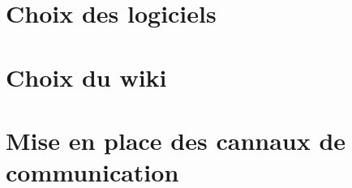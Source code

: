 \documentclass{article}
\begin{document}


\section{Choix des logiciels}



\section{Choix du wiki}



\section{Mise en place des cannaux de communication}


\end{document}
